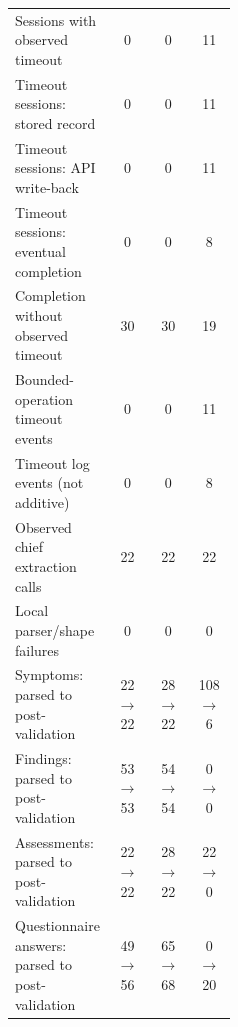 \begin{tabular}{p{0.44\linewidth}ccc}
Sessions with observed timeout & 0 & 0 & 11 \\[3pt]
Timeout sessions: stored record & 0 & 0 & 11 \\[3pt]
Timeout sessions: API write-back & 0 & 0 & 11 \\[3pt]
Timeout sessions: eventual completion & 0 & 0 & 8 \\[3pt]
Completion without observed timeout & 30 & 30 & 19 \\[3pt]
Bounded-operation timeout events & 0 & 0 & 11 \\[3pt]
Timeout log events (not additive) & 0 & 0 & 8 \\[3pt]
Observed chief extraction calls & 22 & 22 & 22 \\[3pt]
Local parser/shape failures & 0 & 0 & 0 \\[3pt]
Symptoms: parsed to post-validation & 22 $\to$ 22 & 28 $\to$ 22 & 108 $\to$ 6 \\[3pt]
Findings: parsed to post-validation & 53 $\to$ 53 & 54 $\to$ 54 & 0 $\to$ 0 \\[3pt]
Assessments: parsed to post-validation & 22 $\to$ 22 & 28 $\to$ 22 & 22 $\to$ 0 \\[3pt]
Questionnaire answers: parsed to post-validation & 49 $\to$ 56 & 65 $\to$ 68 & 0 $\to$ 20 \\[3pt]
\hline
\end{tabular}
